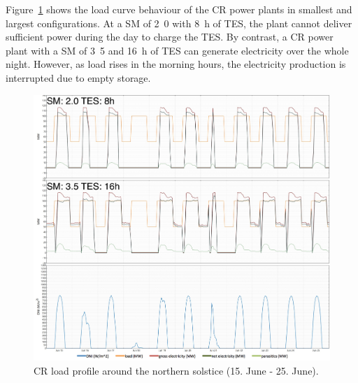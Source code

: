 Figure~\ref{CR_winter_load} shows the load curve behaviour of the \ac{CR} power plants in smallest and largest configurations. At a \ac{SM} of \si{2.0} with \SI{8}{h} of \ac{TES}, the plant cannot deliver sufficient power during the day to charge the \ac{TES}. By contrast, a \ac{CR} power plant with a \ac{SM} of \si{3.5} and \SI{16}{h} of \ac{TES} can generate electricity over the whole night. However, as load rises in the morning hours, the electricity production is interrupted due to empty storage. 
\begin{figure}[htbp]  
\centering
\includegraphics[width=1\linewidth]{FIG/CR_winter_load}
\caption[CR load profile around the northern solstice.]{CR load profile around the northern solstice (15. June - 25. June).}\label{CR_winter_load}
\end{figure}


